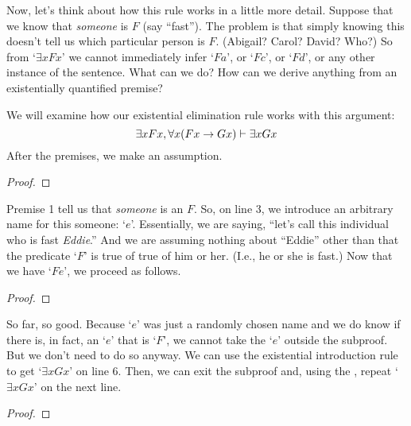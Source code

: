Now, let's think about how this rule works in a little more detail. Suppose that we know that \emph{someone} is $F$ (say ``fast''). The problem is that simply knowing this doesn't tell us which particular person is $F$. (Abigail? Carol? David? Who?) So from `$\exists x Fx$' we cannot immediately infer `$Fa$', or `$Fc$', or `$Fd$',  or any other instance of the sentence. What can we do?  How can we derive anything from an existentially quantified premise?

We will examine how our existential elimination rule works with this argument:
$$\exists x Fx, \forall x(Fx \rightarrow Gx) \vdash \exists x Gx$$
After the premises, we make an assumption.
\begin{proof}
	 \pr{}
	 \pr{}
	\open
		 \as{}
\end{proof}
Premise 1 tell us that \emph{someone} is an $F$.  So, on line 3, we introduce an arbitrary name for this someone: `$e$'. Essentially, we are saying, ``let's call this individual who is fast \textit{Eddie}.'' And we are assuming nothing about ``Eddie'' other than that the predicate `$F$' is true of true of him or her. (I.e., he or she is fast.) Now that we have `$Fe$', we proceed as follows. 
\begin{proof}
	 \pr{}
	 \pr{}
	\open
		 \as{}
		 
\end{proof}
So far, so good. Because `$e$' was just a randomly chosen name and we do know if there is, in fact, an `$e$' that is `$F$', we cannot take the `$e$' outside the subproof. But we don't need to do so anyway. We can use the existential introduction rule to get `$\exists xGx$' on line 6. Then, we can exit the subproof and, using the , repeat `$\exists xGx$' on the next line.
\begin{proof}
	 \pr{}
	 \pr{}
	\open
		 \as{}
		 
	\close
\end{proof}

